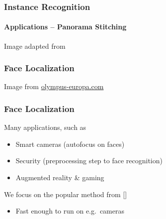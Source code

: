 \documentclass[xetex,professionalfont]{beamer}
\begin{document}
\begin{frame}
\frametitle{Instance Recognition}
\framesubtitle{Applications -- Panorama Stitching}

\begin{center}
    {\centering Image adapted from \cite{brown2007}}
\end{center}

\end{frame}


\begin{frame}
\frametitle{Face Localization}

\begin{center}
    {\centering Image from \url{olympus-europa.com}}
\end{center}

\end{frame}


\begin{frame}
\frametitle{Face Localization}

Many applications, such as
\begin{itemize}
    \item Smart cameras (autofocus on faces)
    \item Security (preprocessing step to face recognition)
    \item Augmented reality \& gaming
\end{itemize}

\bigskip
We focus on the popular method from [\cite{viola2001}]
\begin{itemize}
    \item Fast enough to run on e.g.\ cameras
\end{itemize}

\end{frame}
\end{document}
